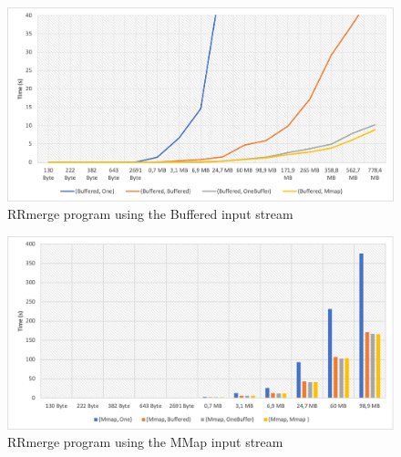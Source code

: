 \documentclass[12pt]{article}
\begin{document}
\begin{figure}[H] 
\begin{adjustwidth}{-3cm}{-3cm}
 \begin{center}
\includegraphics[width=20cm]{images/merge.png}
\end{center}
\caption{RRmerge program using the Buffered input stream}
\label{fig:5}
\end{adjustwidth}
\end{figure}

\begin{figure}[H] 
\begin{adjustwidth}{-3cm}{-1cm}
 \begin{center}
\includegraphics[width=20cm]{images/merge-2.png}
\end{center}
\caption{RRmerge program using the MMap input stream}
\label{fig:6}
\end{adjustwidth}
\end{figure}
\end{document}
